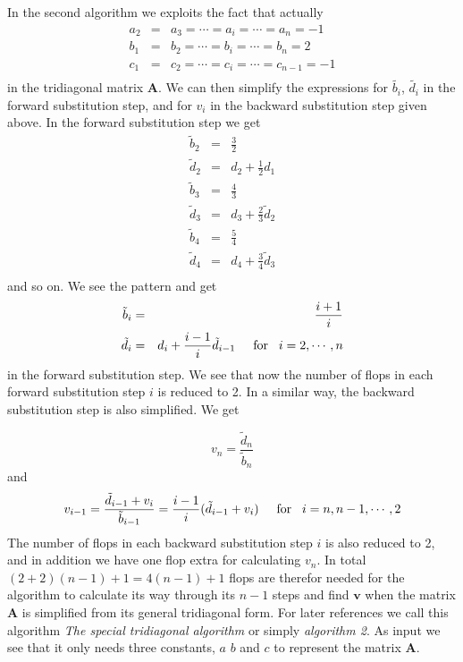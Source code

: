 \documentclass[11pt]{article}
\begin{document}
\vspace{4mm}
\noindent
In the second algorithm we exploits the fact that actually
\begin{eqnarray*}
a_2 &=& a_3 = \cdots = a_i = \cdots = a_{n} = -1\\
b_1 &=& b_2 = \cdots = b_i = \cdots = b_{n} = 2\\
c_1 &=& c_2 = \cdots = c_i = \cdots = c_{n-1} = -1\\
\end{eqnarray*}
in the tridiagonal matrix $\mathbf{A}$. We can then simplify the expressions for $\tilde{b_i}$,
$\tilde{d_i}$ in the forward substitution step, and for $v_i$ in the backward substitution step
given above. In the forward substitution step we get 
\begin{eqnarray*}
\tilde{b}_2 &=& \frac{3}{2}\\
\tilde{d}_2 &=& d_2 + \frac{1}{2} d_1\\
\tilde{b}_3 &=& \frac{4}{3}\\
\tilde{d}_3 &=& d_3 + \frac{2}{3}\tilde{d}_2\\
\tilde{b}_4 &=& \frac{5}{4}\\
\tilde{d}_4 &=& d_4 + \frac{3}{4}\tilde{d}_3\\
\end{eqnarray*}
and so on. We see the pattern and get
\begin{eqnarray*}
\tilde{b}_i &=& \frac{i+1}{i}\\
\tilde{d}_i &=& d_i + \frac{i-1}{i}\tilde{d}_{i-1}
\hspace{0.5cm} \text{for} \hspace{0.3cm} i = 2, \cdots, n  
\end{eqnarray*}
in the forward substitution step. We see that now the number of flops in each forward
substitution step $i$ is reduced to 2. In a similar way, the backward substitution step is also
simplified. We get 

\begin{equation*}
v_n = \frac{\tilde{d}_n}{\tilde{b}_n}
\end{equation*}
and
\begin{equation*}
v_{i-1} = \frac{\tilde{d}_{i-1} + v_i}{\tilde{b}_{i-1}}\\
        = \frac{i-1}{i}(\tilde{d}_{i-1}+ v_i)
\hspace{0.5cm} \text{for} \hspace{0.3cm} i = n, n-1, \cdots, 2  
\end{equation*}
The number of flops in each backward substitution step $i$ is also reduced to 2, and in addition
we have one flop
extra for calculating $v_n$. In total $(2+2)(n-1) + 1 = 4(n-1) +1$ flops are therefor needed
for the algorithm to calculate its way through its $n-1$ steps and find $\mathbf v$ when the 
matrix $\mathbf{A}$ is simplified from its general tridiagonal form. 
For later references we call this algorithm 
\emph{The special tridiagonal algorithm} or simply \emph{algorithm 2}. As input we see
that it only needs three constants, $ a$ $b$ and $c$ to represent
the matrix $\mathbf A$.
\end{document}

